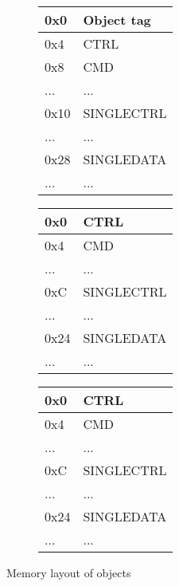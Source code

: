 \begin{figure}[H]

  \centering
  \begin{subfigure}{0.31\textwidth}
    \begin{tabular}{|l|l|}
      \hline
      0x0&Object tag \\ \hline
      0x4&CTRL       \\ \hline
      0x8&CMD        \\ \hline
      ...&...        \\ \hline
      0x10&SINGLECTRL\\ \hline
      ...&...        \\ \hline
      0x28&SINGLEDATA\\ \hline
      ...&...        \\ \hline
    \end{tabular}
    \caption{{\Java}}
    \label{fig:back:memlayout:java}
  \end{subfigure}
  \hfill
  \begin{subfigure}{0.31\textwidth}
    \begin{tabular}{|l|l|}
      \hline
      0x0&CTRL       \\ \hline
      0x4&CMD        \\ \hline
      ...&...        \\ \hline
      0xC&SINGLECTRL \\ \hline
      ...&...        \\ \hline
      0x24&SINGLEDATA\\ \hline
      ...&...        \\ \hline
    \end{tabular}
    \caption{\rust}
    \label{fig:back:memlayout:rust}
  \end{subfigure}
  \hfill
  \begin{subfigure}{0.31\textwidth}
    \begin{tabular}{|l|l|}
      \hline
      0x0&CTRL       \\ \hline
      0x4&CMD        \\ \hline
      ...&...        \\ \hline
      0xC&SINGLECTRL \\ \hline
      ...&...        \\ \hline
      0x24&SINGLEDATA\\ \hline
      ...&...        \\ \hline
    \end{tabular}
        \caption{{\C}}
    \label{fig:back:memlayout:c}
  \end{subfigure}
  \caption{Memory layout of objects}
  \label{fig:back:memlayout}

\end{figure}

